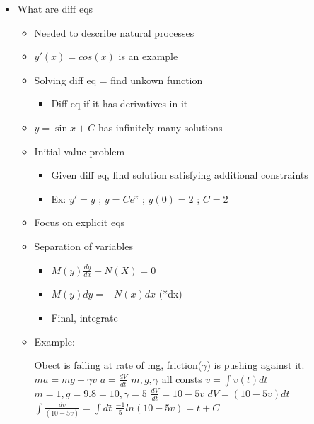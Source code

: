 \begin{itemize}

  \item What are diff eqs
  \begin{itemize}
    \item Needed to describe natural processes\
    \item $y'(x) = cos(x)$ is an example
    \item Solving diff eq = find unkown function
    \begin{itemize}
      \item Diff eq if it has derivatives in it
    \end{itemize}
    \item $y = \sin x + C$ has infinitely many solutions
    \item Initial value problem
    \begin{itemize}
      \item Given diff eq, find solution satisfying additional constraints
      \item Ex: $y' = y$ ; $y=Ce^x$ ; $y(0) = 2$ ; $C=2$
    \end{itemize}
    \item Focus on explicit eqs
    \item Separation of variables
    \begin{itemize}
      \item $M(y)\frac{dy}{dx} +N(X) = 0$
      \item $M(y)dy = -N(x)dx$ (*dx)
      \item Final, integrate
    \end{itemize}
    \item Example:\newline
    \begin{minipage}{2in}
      Obect is falling at rate of mg, friction($\gamma$) is pushing against it.\newline
      $ma = mg - \gamma v$\newline
      $a = \frac{dV}{dt}$\newline
      $m,g,\gamma$ all consts\newline
      $v = \int v(t)dt$\newline
      $m=1, g=9.8=10, \gamma = 5$\newline
      $\frac{dV}{dt} = 10-5v$\newline
      $dV=(10-5v)dt$ \newline
      $\int \frac{dv}{(10-5v)} = \int dt$\=\newline
      $\frac{-1}{5} ln(10-5v) = t + C$\newline

\end{minipage}
\end{itemize}
\end{itemize}
